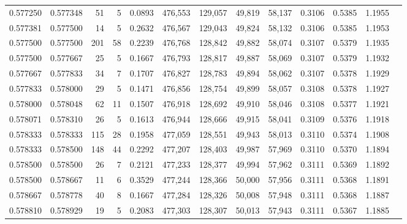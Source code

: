 \begin{tabular}{rrrrrrrrrrrrr}
0.577250 & 0.577348 &    51 &   5 &                                     0.0893 & 476,553 & 129,057 &  49,819 &  58,137 & 0.3106 & 0.5385 & 1.1955 \\
0.577381 & 0.577500 &    14 &   5 &                                     0.2632 & 476,567 & 129,043 &  49,824 &  58,132 & 0.3106 & 0.5385 & 1.1953 \\
0.577500 & 0.577500 &   201 &  58 &                                     0.2239 & 476,768 & 128,842 &  49,882 &  58,074 & 0.3107 & 0.5379 & 1.1935 \\
0.577500 & 0.577667 &    25 &   5 &                                     0.1667 & 476,793 & 128,817 &  49,887 &  58,069 & 0.3107 & 0.5379 & 1.1932 \\
0.577667 & 0.577833 &    34 &   7 &                                     0.1707 & 476,827 & 128,783 &  49,894 &  58,062 & 0.3107 & 0.5378 & 1.1929 \\
0.577833 & 0.578000 &    29 &   5 &                                     0.1471 & 476,856 & 128,754 &  49,899 &  58,057 & 0.3108 & 0.5378 & 1.1927 \\
0.578000 & 0.578048 &    62 &  11 &                                     0.1507 & 476,918 & 128,692 &  49,910 &  58,046 & 0.3108 & 0.5377 & 1.1921 \\
0.578071 & 0.578310 &    26 &   5 &                                     0.1613 & 476,944 & 128,666 &  49,915 &  58,041 & 0.3109 & 0.5376 & 1.1918 \\
0.578333 & 0.578333 &   115 &  28 &                                     0.1958 & 477,059 & 128,551 &  49,943 &  58,013 & 0.3110 & 0.5374 & 1.1908 \\
0.578333 & 0.578500 &   148 &  44 &                                     0.2292 & 477,207 & 128,403 &  49,987 &  57,969 & 0.3110 & 0.5370 & 1.1894 \\
0.578500 & 0.578500 &    26 &   7 &                                     0.2121 & 477,233 & 128,377 &  49,994 &  57,962 & 0.3111 & 0.5369 & 1.1892 \\
0.578500 & 0.578667 &    11 &   6 &                                     0.3529 & 477,244 & 128,366 &  50,000 &  57,956 & 0.3111 & 0.5368 & 1.1891 \\
0.578667 & 0.578778 &    40 &   8 &                                     0.1667 & 477,284 & 128,326 &  50,008 &  57,948 & 0.3111 & 0.5368 & 1.1887 \\
0.578810 & 0.578929 &    19 &   5 &                                     0.2083 & 477,303 & 128,307 &  50,013 &  57,943 & 0.3111 & 0.5367 & 1.1885 \\

\end{tabular}
